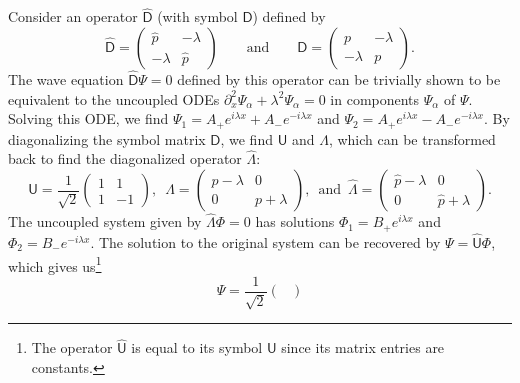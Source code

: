 \begin{example}
Consider an operator $\hat{\mathsf{D}}$ (with symbol $\mathsf{D}$) defined by
%
\begin{equation}
  \hat{\mathsf{D}} =
  \begin{pmatrix}
    \hat{p} & -\lambda\\
    -\lambda & \hat{p}
  \end{pmatrix}
  \qquad\text{and}\qquad
  \mathsf{D} =
  \begin{pmatrix}
    p & -\lambda\\
    -\lambda & p
  \end{pmatrix}.
\end{equation}
%
The wave equation $\hat{\mathsf{D}}\Psi = 0$ defined by this operator can be trivially shown to be equivalent to the uncoupled ODEs $\partial_{x}^{2}\Psi_{\alpha} + \lambda^{2}\Psi_{\alpha} = 0$ in components $\Psi_{\alpha}$ of $\Psi$.
Solving this ODE, we find $\Psi_{1} = A_{+}e^{i \lambda x} + A_{-}e^{-i\lambda x}$ and $\Psi_{2} = A_{+}e^{i \lambda x} - A_{-}e^{-i\lambda x}$.
%
By diagonalizing the symbol matrix $\mathsf{D}$, we find $\mathsf{U}$ and $\Lambda$, which can be transformed back to find the diagonalized operator $\hat{\Lambda}$:
%
\begin{equation}
  \mathsf{U} = \frac{1}{\sqrt{2}}
  \begin{pmatrix}
    1 & 1\\
    1 & -1
  \end{pmatrix},\enspace
  \Lambda =
  \begin{pmatrix}
    p - \lambda & 0\\
    0 & p + \lambda
  \end{pmatrix},\enspace
  \text{and}\enspace
  \hat{\Lambda} =
  \begin{pmatrix}
    \hat{p} - \lambda & 0\\
    0 & \hat{p} + \lambda
  \end{pmatrix}.
\end{equation}
%
The uncoupled system given by $\hat{\Lambda}\Phi = 0 $ has solutions $\Phi_{1} = B_{+}e^{i\lambda x}$ and $\Phi_{2} = B_{-}e^{-i\lambda x}$.
The solution to the original system can be recovered by $\Psi = \hat{\mathsf{U}}\Phi$, which gives us\footnote{The operator $\hat{\mathsf{U}}$ is equal to its symbol $\mathsf{U}$ since its matrix entries are constants.}
%
\begin{equation}
  \Psi = \frac{1}{\sqrt{2}}
  \begin{pmatrix}

\end{pmatrix}
\end{equation}
\end{example}
